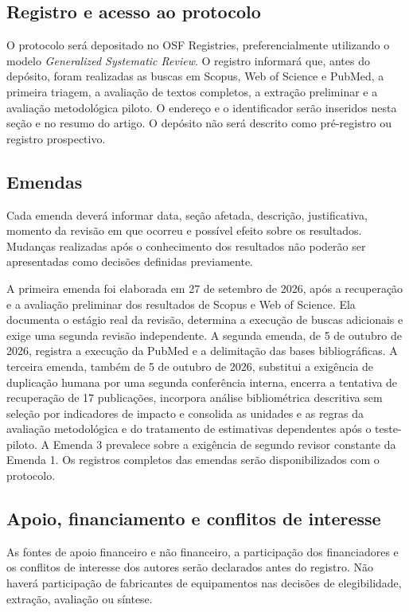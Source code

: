 \documentclass[11pt,a4paper]{article}
\begin{document}
\subsection{Registro e acesso ao protocolo}

O protocolo será depositado no OSF Registries, preferencialmente utilizando o modelo
\emph{Generalized Systematic Review}. O registro informará que, antes do depósito,
foram realizadas as buscas em Scopus, Web of Science e PubMed, a primeira triagem, a
avaliação de textos completos, a extração preliminar e a avaliação metodológica
piloto. O
endereço e o identificador serão inseridos nesta seção e no resumo do artigo. O
depósito não será descrito como pré-registro ou registro prospectivo.

\subsection{Emendas}

Cada emenda deverá informar data, seção afetada, descrição, justificativa, momento
da revisão em que ocorreu e possível efeito sobre os resultados. Mudanças realizadas
após o conhecimento dos resultados não poderão ser apresentadas como decisões
definidas previamente.

A primeira emenda foi elaborada em 27 de setembro de 2026, após a recuperação e a
avaliação preliminar dos resultados de Scopus e Web of Science. Ela documenta o estágio
real da revisão, determina a execução de buscas adicionais e exige uma segunda revisão
independente. A segunda emenda, de 5 de outubro de 2026, registra a execução da PubMed
e a delimitação das bases bibliográficas. A terceira emenda, também de 5 de outubro de
2026, substitui a exigência de duplicação humana por uma segunda conferência interna,
encerra a tentativa de recuperação de 17 publicações, incorpora análise bibliométrica
descritiva sem seleção por indicadores de impacto e consolida as unidades e as regras
da avaliação metodológica e do tratamento de estimativas dependentes após o
teste-piloto. A Emenda 3 prevalece sobre a exigência de segundo revisor constante da
Emenda 1. Os registros completos das emendas serão disponibilizados com o protocolo.

\subsection{Apoio, financiamento e conflitos de interesse}

As fontes de apoio financeiro e não financeiro, a participação dos financiadores e
os conflitos de interesse dos autores serão declarados antes do registro. Não haverá
participação de fabricantes de equipamentos nas decisões de elegibilidade, extração,
avaliação ou síntese.
\end{document}
